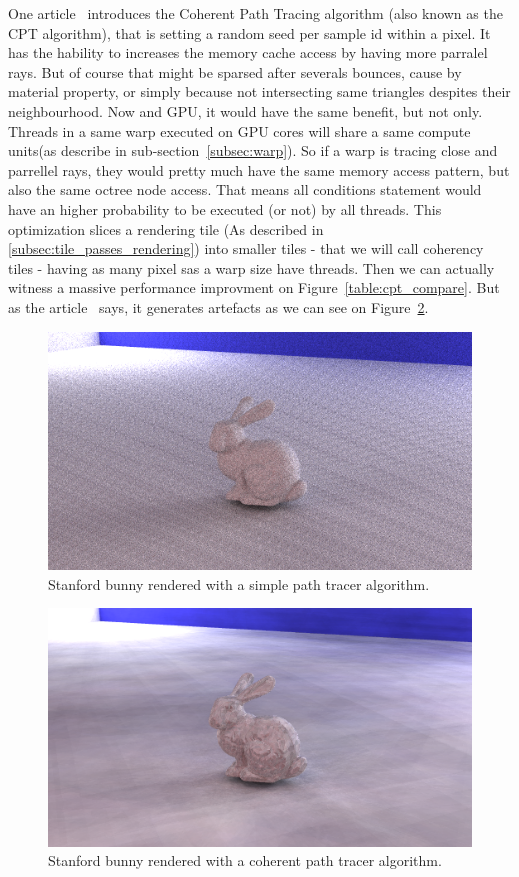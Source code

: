 \label{subsec:cpt}
One article~\cite{cpt} introduces the Coherent Path Tracing algorithm (also known
as the CPT algorithm), that is setting a
random seed per sample id within a pixel. It has the hability to increases the
memory cache access by having more parralel rays. But of course that might be
sparsed after severals bounces, cause by material property, or simply because
not intersecting same triangles despites their neighbourhood. Now and GPU, it
would have the same benefit, but not only. Threads in a same warp executed on
GPU cores will share a same compute units(as describe in sub-section~\ref{subsec:warp}). So
if a warp is tracing close and parrellel rays, they would pretty much have
the same memory access pattern, but also the same octree node access. That means
all conditions statement would have an higher probability to be executed (or not)
by all threads. This optimization slices a rendering tile (As described
in \ref{subsec:tile_passes_rendering}) into smaller tiles - that we will call
coherency tiles - having as many pixel sas a warp size have threads. Then we can
actually witness a massive performance improvment on Figure~\ref{table:cpt_compare}.
But as the article~\cite{cpt} says, it generates artefacts as we can see on
Figure~\ref{fig:stanford_bunny_cpt}.

\begin{figure}[h]
    \centering
    \includegraphics[width=0.8\columnwidth]{render_stanford_bunny_dummy.png}
    \caption{Stanford bunny rendered with a simple path tracer algorithm.}
    \label{fig:stanford_bunny_dummy}
\end{figure}

\begin{figure}[h]
    \centering
    \includegraphics[width=0.8\columnwidth]{render_stanford_bunny_cpt.png}
    \caption{Stanford bunny rendered with a coherent path tracer algorithm.}
    \label{fig:stanford_bunny_cpt}
\end{figure}

